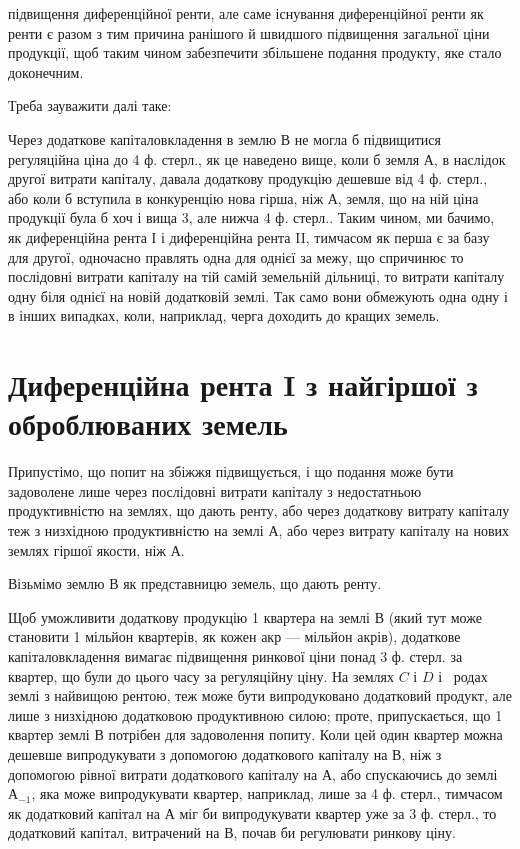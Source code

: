 \parcont{}  %
підвищення диференційної ренти, але саме існування диференційної ренти як
ренти є разом з тим причина ранішого й швидшого підвищення загальної ціни
продукції, щоб таким чином забезпечити збільшене подання продукту, яке стало доконечним.

Треба зауважити далі таке:

Через додаткове капіталовкладення в землю $В$ не могла б підвищитися
регуляційна ціна до 4 ф. стерл., як це наведено вище, коли б земля $А$, в наслідок
другої витрати капіталу, давала додаткову продукцію дешевше від 4 ф.
стерл., або коли б вступила в конкуренцію нова гірша, ніж $А$, земля, що на
ній ціна продукції була б хоч і вища 3, але нижча 4 ф. стерл.. Таким чином,
ми бачимо, як диференційна рента І і диференційна рента II, тимчасом як
перша є за базу для другої, одночасно правлять одна для однієї за межу, що
спричинює то послідовні витрати капіталу на тій самій земельній дільниці, то
витрати капіталу одну біля однієї на новій додатковій землі. Так само вони
обмежують одна одну і в інших випадках, коли, наприклад, черга доходить до
кращих земель.

\section{Диференційна рента I з найгіршої з оброблюваних земель}

Припустімо, що попит на збіжжя підвищується, і що подання може бути
задоволене лише через послідовні витрати капіталу з недостатньою продуктивністю
на землях, що дають ренту, або через додаткову витрату капіталу
теж з низхідною продуктивністю на землі $А$, або через витрату капіталу на
нових землях гіршої якости, ніж $А$.

Візьмімо землю $В$ як представницю земель, що дають ренту.

Щоб уможливити додаткову продукцію 1 квартера на землі $В$ (який
тут може становити 1 мільйон квартерів, як кожен акр — мільйон акрів), додаткове
капіталовкладення вимагає підвищення ринкової ціни понад 3 ф. стерл.
за квартер, що були до цього часу за регуляційну ціну. На землях $C$ і $D$ і~ родах землі з найвищою рентою, теж може бути випродуковано додатковий
продукт, але лише з низхідною додатковою продуктивною силою; проте,
припускається, що 1 квартер землі $В$ потрібен для задоволення попиту.
Коли цей один квартер можна дешевше випродукувати з допомогою додаткового
капіталу на $В$, ніж з допомогою рівної витрати додаткового капіталу
на $А$, або спускаючись до землі $А_{-1}$, яка може випродукувати квартер, наприклад,
лише за 4 ф. стерл., тимчасом як додатковий капітал на $А$ міг би випродукувати
квартер уже за 3 ф. стерл., то додатковий капітал, витрачений на
$В$, почав би регулювати ринкову ціну.

